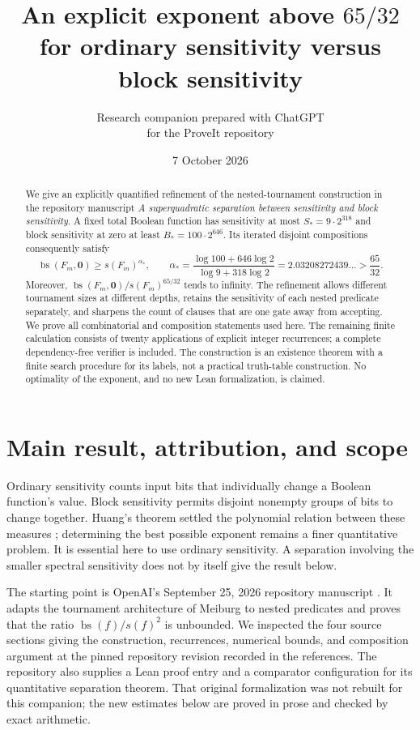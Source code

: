 \documentclass[11pt]{article}
\title{An explicit exponent above $65/32$\\
for ordinary sensitivity versus block sensitivity}
\author{Research companion prepared with ChatGPT\\for the ProveIt repository}
\date{7 October 2026}
\theoremstyle{definition}
\theoremstyle{remark}
\DeclareMathOperator{\bs}{bs}
\newcommand{\sens}{s}
\newcommand{\zero}{\mathbf{0}}
\begin{document}
\maketitle

\begin{abstract}
We give an explicitly quantified refinement of the nested-tournament
construction in the repository manuscript \emph{A superquadratic separation
between sensitivity and block sensitivity}.  A fixed total Boolean function
has sensitivity at most $S_*=9\cdot2^{318}$ and block sensitivity at zero at
least $B_*=100\cdot2^{646}$.  Its iterated disjoint compositions consequently
satisfy
\[
 \bs(F_m,\zero)\ge \sens(F_m)^{\alpha_*},\qquad
 \alpha_*=
 \frac{\log100+646\log2}{\log9+318\log2}
 =2.03208272439\ldots>\frac{65}{32}.
\]
Moreover, $\bs(F_m,\zero)/\sens(F_m)^{65/32}$ tends to infinity.
The refinement allows different tournament sizes at different depths,
retains the sensitivity of each nested predicate separately, and sharpens
the count of clauses that are one gate away from accepting.  We prove all
combinatorial and composition statements used here.  The remaining finite
calculation consists of twenty applications of explicit integer
recurrences; a complete dependency-free verifier is included.  The
construction is an existence theorem with a finite search procedure for
its labels, not a practical truth-table construction.  No optimality of
the exponent, and no new Lean formalization, is claimed.
\end{abstract}

\tableofcontents

\section{Main result, attribution, and scope}
\label{sec:main}

Ordinary sensitivity counts input bits that individually change a Boolean
function's value.  Block sensitivity permits disjoint nonempty groups of
bits to change together.  Huang's theorem settled the polynomial relation
between these measures \cite{Huang2019}; determining the best possible
exponent remains a finer quantitative problem.  It is essential here to
use ordinary sensitivity.  A separation involving the smaller spectral
sensitivity does not by itself give the result below.

The starting point is OpenAI's September 25, 2026 repository manuscript
\cite{OpenAI2026}.  It adapts the tournament architecture of Meiburg
\cite{Meiburg2026} to nested predicates and proves that the ratio
$\bs(f)/\sens(f)^2$ is unbounded.  We inspected the four source sections
giving the construction, recurrences, numerical bounds, and composition
argument at the pinned repository revision recorded in the references.
The repository also supplies a Lean proof entry and a comparator
configuration for its quantitative separation theorem.  That original
formalization was not rebuilt for this companion; the new estimates below
are proved in prose and checked by exact arithmetic.
\end{document}
